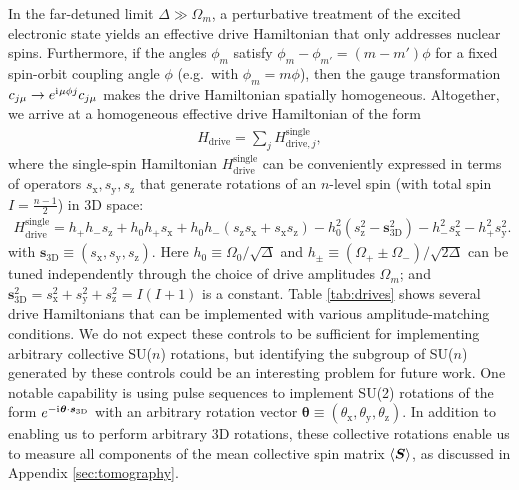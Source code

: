 \documentclass[nofootinbib,notitlepage,11pt]{revtex4-2}
\renewcommand{\t}{\text} %
\newcommand{\p}[1]{\left(#1\right)} %
\newcommand{\bk}{\Braket} %
\renewcommand{\v}{\bm} %
\renewcommand{\c}{\cdot} %
\renewcommand{\i}{\mathrm{i}\mkern1mu} %
\newcommand{\1}{\mathds{1}}
\newcommand{\x}{\text{x}}
\newcommand{\y}{\text{y}}
\newcommand{\z}{\text{z}}
\begin{document}
In the far-detuned limit $\Delta\gg\Omega_m$, a perturbative treatment of the excited electronic state yields an effective drive Hamiltonian that only addresses nuclear spins.
Furthermore, if the angles $\phi_m$ satisfy $\phi_m-\phi_{m'}=\p{m-m'}\phi$ for a fixed spin-orbit coupling angle $\phi$ (e.g.~with $\phi_m=m\phi$), then the gauge transformation $c_{j\mu}\to e^{\i\mu\phi j} c_{j\mu}$ makes the drive Hamiltonian spatially homogeneous.
Altogether, we arrive at a homogeneous effective drive Hamiltonian of the form
\begin{align}
  H_{\t{drive}} = \sum_j H_{\t{drive},j}^{\t{single}},
\end{align}
where the single-spin Hamiltonian $H_{\t{drive}}^{\t{single}}$ can be conveniently expressed in terms of operators $s_\x,s_\y,s_\z$ that generate rotations of an $n$-level spin (with total spin $I=\frac{n-1}{2}$) in 3D space:
\begin{align}
  H_{\t{drive}}^{\t{single}}
  = h_+ h_- s_\z + h_0 h_+ s_\x
  + h_0 h_- \p{s_\z s_\x  + s_\x s_\z}
  - h_0^2\p{s_\z^2-\v s_{\t{3D}}^2} - h_-^2 s_\x^2 - h_+^2 s_\y^2.
\end{align}
with $\v s_{\t{3D}}\equiv\p{s_\x,s_\y,s_\z}$.
Here $h_0\equiv\Omega_0/\sqrt\Delta$ and $h_\pm\equiv\p{\Omega_+\pm\Omega_-}/\sqrt{2\Delta}$ can be tuned independently through the choice of drive amplitudes $\Omega_m$; and $\v s_{\t{3D}}^2=s_\x^2+s_\y^2+s_\z^2=I\p{I+1}$ is a constant.
Table \ref{tab:drives} shows several drive Hamiltonians that can be implemented with various amplitude-matching conditions.
We do not expect these controls to be sufficient for implementing arbitrary collective SU($n$) rotations, but identifying the subgroup of SU($n$) generated by these controls could be an interesting problem for future work.
One notable capability is using pulse sequences to implement SU(2) rotations of the form $e^{-\i\v\theta\c\v s_{\t{3D}}}$ with an arbitrary rotation vector $\v\theta\equiv\p{\theta_\x,\theta_\y,\theta_\z}$.
In addition to enabling us to perform arbitrary 3D rotations, these collective rotations enable us to measure all components of the mean collective spin matrix $\bk{\v S}$, as discussed in Appendix \ref{sec:tomography}.
\end{document}
